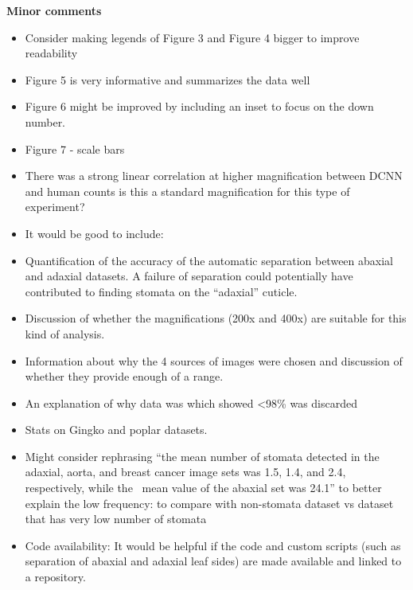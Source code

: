 \documentclass[10pt]{article}
\providecommand{\tightlist}{\setlength{\itemsep}{0pt}\setlength{\parskip}{0pt}}%
\begin{document}
\textbf{Minor comments}

\begin{itemize}
\tightlist
\item
  Consider making legends of Figure 3 and Figure 4 bigger to improve
  readability
\end{itemize}

\par\null

\begin{itemize}
\tightlist
\item
  Figure 5 is very informative and summarizes the data well
\item
  Figure 6 might be improved by including an inset to focus on the down
  number.
\item
  Figure 7 - scale bars
\item
  There was a strong linear correlation at higher magnification between
  DCNN and human counts is this a standard magnification for this type
  of experiment?
\item
  It would be good to include:
\item
  Quantification of the accuracy of the automatic separation between
  abaxial and adaxial datasets. A failure of separation could
  potentially have contributed to finding stomata on the ``adaxial''
  cuticle.
\item
  Discussion of whether the magnifications (200x and 400x) are suitable
  for this kind of analysis.
\item
  Information about why the 4 sources of images were chosen and
  discussion of whether they provide enough of a range.
\item
  An explanation of why data was which showed \textless{}98\% was
  discarded
\item
  Stats on Gingko and poplar datasets.
\item
  Might consider rephrasing ``the mean number of stomata detected in the
  adaxial, aorta, and breast cancer image sets was 1.5, 1.4, and 2.4,
  respectively, while the ~mean value of the abaxial set was 24.1'' to
  better explain the low frequency: to compare with non-stomata dataset
  vs dataset that has very low number of stomata
\item
  Code availability: It would be helpful if the code and custom scripts
  (such as separation of abaxial and adaxial leaf sides) are made
  available and linked to a repository.
\end{itemize}

\FloatBarrier
\end{document}
